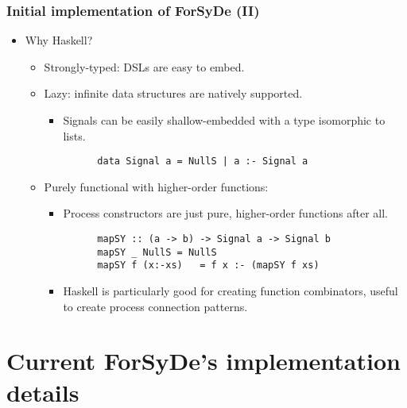 \documentclass{beamer}
\begin{document}
\begin{frame}[fragile]
  \frametitle{Initial implementation of ForSyDe (II)}
  
  \begin{itemize}
  \item Why Haskell?
    \begin{itemize}
      \pause
    \item Strongly-typed: DSLs are easy to embed.
      \pause
    \item Lazy: infinite data structures are natively supported.
      \begin{itemize}
      \item Signals can be easily shallow-embedded with a type isomorphic to 
        lists.
\begin{lstlisting}
      data Signal a = NullS | a :- Signal a
\end{lstlisting}
      \end{itemize}
      \pause
    \item Purely functional with higher-order functions: 
      \begin{itemize}
      \item Process constructors are just pure, higher-order functions after all.
\begin{lstlisting}
      mapSY :: (a -> b) -> Signal a -> Signal b
      mapSY _ NullS	= NullS
      mapSY f (x:-xs)	= f x :- (mapSY f xs)
\end{lstlisting}
      \item Haskell is particularly good for creating function
        combinators, useful to create process connection patterns.
      \end{itemize}
    \end{itemize}
  \end{itemize}
\end{frame}

\section{Current ForSyDe's implementation details}
\end{document}
